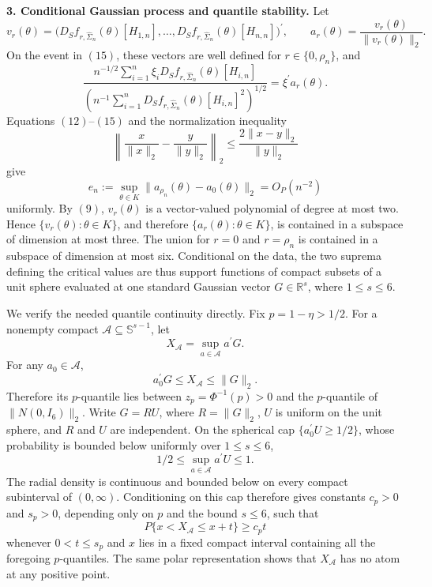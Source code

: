 \textbf{3. Conditional Gaussian process and quantile stability.}
Let
\[
 v_r(\theta)=\bigl(D_Sf_{r,\widehat\Sigma_n}(\theta)[H_{1,n}],\ldots,
 D_Sf_{r,\widehat\Sigma_n}(\theta)[H_{n,n}]\bigr)^{\prime},
 \qquad
 a_r(\theta)=\frac{v_r(\theta)}{\|v_r(\theta)\|_2}.
\]
On the event in \((15)\), these vectors are well defined for \(r\in\{0,\rho_n\}\), and
\[
 \frac{n^{-1/2}\sum_{i=1}^n\xi_iD_Sf_{r,\widehat\Sigma_n}(\theta)[H_{i,n}]}
 {(n^{-1}\sum_{i=1}^nD_Sf_{r,\widehat\Sigma_n}(\theta)[H_{i,n}]^2)^{1/2}}
 =\xi^{\prime}a_r(\theta). \tag{16}
\]
Equations \((12)\)--\((15)\) and the normalization inequality
\[
 \left\|\frac{x}{\|x\|_2}-\frac{y}{\|y\|_2}\right\|_2
 \leq \frac{2\|x-y\|_2}{\|y\|_2}
\]
give
\[
 e_n:=\sup_{\theta\in K}\|a_{\rho_n}(\theta)-a_0(\theta)\|_2=O_P(n^{-2}) \tag{17}
\]
uniformly. By \((9)\), \(v_r(\theta)\) is a vector-valued polynomial of degree at most two. Hence \(\{v_r(\theta):\theta\in K\}\), and therefore \(\{a_r(\theta):\theta\in K\}\), is contained in a subspace of dimension at most three. The union for \(r=0\) and \(r=\rho_n\) is contained in a subspace of dimension at most six. Conditional on the data, the two suprema defining the critical values are thus support functions of compact subsets of a unit sphere evaluated at one standard Gaussian vector \(G\in\mathbb R^s\), where \(1\leq s\leq6\).

We verify the needed quantile continuity directly. Fix \(p=1-\eta>1/2\). For a nonempty compact \(\mathcal A\subseteq\mathbb S^{s-1}\), let
\[
 X_{\mathcal A}=\sup_{a\in\mathcal A}a^{\prime}G.
\]
For any \(a_0\in\mathcal A\),
\[
 a_0^{\prime}G\leq X_{\mathcal A}\leq\|G\|_2.
\]
Therefore its \(p\)-quantile lies between \(z_p=\Phi^{-1}(p)>0\) and the \(p\)-quantile of \(\|N(0,I_6)\|_2\). Write \(G=RU\), where \(R=\|G\|_2\), \(U\) is uniform on the unit sphere, and \(R\) and \(U\) are independent. On the spherical cap \(\{a_0^{\prime}U\geq1/2\}\), whose probability is bounded below uniformly over \(1\leq s\leq6\),
\[
 1/2\leq\sup_{a\in\mathcal A}a^{\prime}U\leq1.
\]
The radial density is continuous and bounded below on every compact subinterval of \((0,\infty)\). Conditioning on this cap therefore gives constants \(c_p>0\) and \(s_p>0\), depending only on \(p\) and the bound \(s\leq6\), such that
\[
 P\{x<X_{\mathcal A}\leq x+t\}\geq c_pt \tag{18}
\]
whenever \(0<t\leq s_p\) and \(x\) lies in a fixed compact interval containing all the foregoing \(p\)-quantiles. The same polar representation shows that \(X_{\mathcal A}\) has no atom at any positive point.

